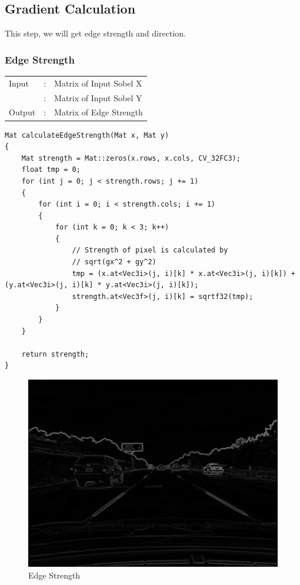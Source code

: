 \documentclass[12pt,a4paper]{report}
\begin{document}
\clearpage


\subsection{Gradient Calculation}
This step, we will get edge strength and direction.

\subsubsection{Edge Strength}
\begin{tabular}{lll}
  Input  & : & Matrix of Input Sobel X  \\
         & : & Matrix of Input Sobel Y  \\
  Output & : & Matrix of Edge Strength \\
\end{tabular}
\begin{lstlisting}
Mat calculateEdgeStrength(Mat x, Mat y)
{
    Mat strength = Mat::zeros(x.rows, x.cols, CV_32FC3);
    float tmp = 0;
    for (int j = 0; j < strength.rows; j += 1)
    {
        for (int i = 0; i < strength.cols; i += 1)
        {
            for (int k = 0; k < 3; k++)
            {
                // Strength of pixel is calculated by
                // sqrt(gx^2 + gy^2)
                tmp = (x.at<Vec3i>(j, i)[k] * x.at<Vec3i>(j, i)[k]) + (y.at<Vec3i>(j, i)[k] * y.at<Vec3i>(j, i)[k]);
                strength.at<Vec3f>(j, i)[k] = sqrtf32(tmp);
            }
        }
    }

    return strength;
}
\end{lstlisting}
\begin{figure}[!htb]
  \centering
  \includegraphics[height=0.4\paperheight]{output/img2_q2_EDGE_STRENGTH.png}
  \caption{Edge Strength}
\end{figure}
\clearpage
\end{document}
